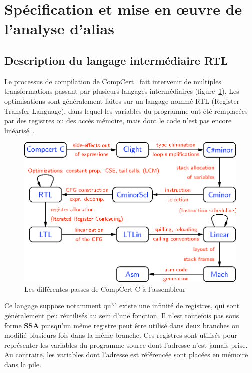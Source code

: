 \documentclass{article}
\begin{document}
\section{Spécification et mise en œuvre de l'analyse d'alias}

\subsection{Description du langage intermédiaire RTL}

Le processus de compilation de CompCert~\cite{2009-Leroy-Compcert-CACM} fait
intervenir de multiples transformations passant par plusieurs langages
intermédiaires (figure~\ref{passes}). Les optimisations sont généralement
faites sur un langage nommé RTL (Register Transfer Language), dans lequel les
variables du programme ont été remplacées par des registres ou des accès
mémoire, mais dont le code n'est pas encore
linéarisé~\cite{2009-Leroy-Compcert-backend}.

\begin{figure}[ht]
  \begin{center}
    \includegraphics{passes.eps}
  \end{center}
  \caption{Les différentes passes de CompCert C à l'assembleur}
  \label{passes}
\end{figure}

Ce langage suppose notamment qu'il existe une infinité de registres, qui sont
généralement peu réutilisés au sein d'une fonction. Il n'est toutefois pas sous
forme {\bf \gls{SSA}} puisqu'un même registre peut être utilisé dans deux
branches ou modifié plusieurs fois dans la même branche. Ces registres sont
utilisés pour représenter les variables du programme source dont l'adresse
n'est jamais prise. Au contraire, les variables dont l'adresse est référencée
sont placées en mémoire dans la pile.
\end{document}
